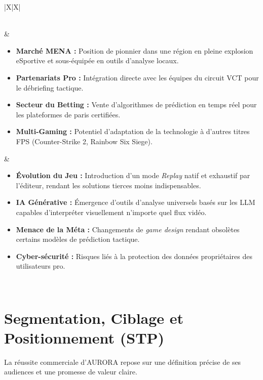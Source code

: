\documentclass[a4paper,11pt]{article}
\begin{document}
\begin{table}[h!]
\begin{tabularx}{\textwidth}{|X|X|}
\begin{itemize}[leftmargin=*, nosep]
\end{itemize} \\ \hline
{}  &  \\ \hline
\begin{itemize}[leftmargin=*, nosep]
    \item \textbf{Marché MENA :} Position de pionnier dans une région en pleine explosion eSportive et sous-équipée en outils d'analyse locaux.
    \item \textbf{Partenariats Pro :} Intégration directe avec les équipes du circuit VCT pour le débriefing tactique.
    \item \textbf{Secteur du Betting :} Vente d'algorithmes de prédiction en temps réel pour les plateformes de paris certifiées.
    \item \textbf{Multi-Gaming :} Potentiel d'adaptation de la technologie à d'autres titres FPS (Counter-Strike 2, Rainbow Six Siege).
\end{itemize} & 
\begin{itemize}[leftmargin=*, nosep]
    \item \textbf{Évolution du Jeu :} Introduction d'un mode \textit{Replay} natif et exhaustif par l'éditeur, rendant les solutions tierces moins indispensables.
    \item \textbf{IA Générative :} Émergence d'outils d'analyse universels basés sur les LLM capables d'interpréter visuellement n'importe quel flux vidéo.
    \item \textbf{Menace de la Méta :} Changements de \textit{game design} rendant obsolètes certains modèles de prédiction tactique.
    \item \textbf{Cyber-sécurité :} Risques liés à la protection des données propriétaires des utilisateurs pro.
\end{itemize} \\ \hline
\end{tabularx}
\caption{Matrice SWOT détaillée du projet AURORA.}
\end{table}

\newpage

\section{Segmentation, Ciblage et Positionnement (STP)}
La réussite commerciale d'AURORA repose sur une définition précise de ses audiences et une promesse de valeur claire.
\end{document}
